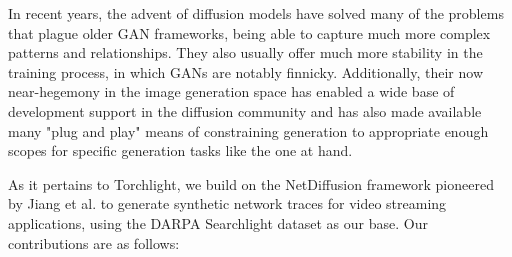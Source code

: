 \documentclass[acmsmall, nonacm]{acmart}
\begin{document}
In recent years, the advent of diffusion models have solved many of the
problems that plague older GAN frameworks, being able to capture much
more complex patterns and relationships. They also usually offer much more
stability in the training process, in which GANs are notably finnicky.
Additionally, their now near-hegemony in the image generation space has
enabled a wide base of development support in the diffusion community 
and has also made available many "plug and play"
means of constraining generation to appropriate enough scopes for specific generation
tasks like the one at hand.

As it pertains to Torchlight, we build on the NetDiffusion framework pioneered
by Jiang et al. \cite{Jiang2024} to generate synthetic network traces for video
streaming applications, using the DARPA Searchlight dataset \cite{Ardi2022} as
our base. Our contributions are as follows:
\end{document}

